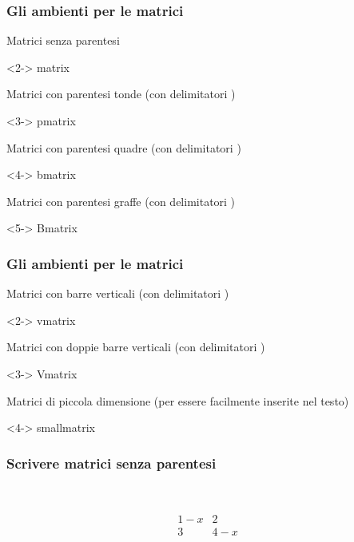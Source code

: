 \begin{frame}
  \frametitle{Gli ambienti per le matrici}
	Matrici	senza parentesi
	\begin{LaTeXcode}<2->
		matrix
	\end{LaTeXcode}
	Matrici con parentesi tonde (con delimitatori \LCmd[]{(}\;\LCmd[]{)})
	\begin{LaTeXcode}<3->
		pmatrix
	\end{LaTeXcode}
	Matrici con parentesi quadre (con delimitatori \LCmd[]{\ls\;\rs})
	\begin{LaTeXcode}<4->
		bmatrix
	\end{LaTeXcode}
	Matrici con parentesi graffe (con delimitatori \LCmd[]{\tlb}\;\LCmd[]{\trb})
	\begin{LaTeXcode}<5->
		Bmatrix
	\end{LaTeXcode}
\end{frame}
\begin{frame}
  \frametitle{Gli ambienti per le matrici}
	Matrici con barre verticali (con delimitatori \LCmd[]{|}\;\LCmd[]{|})
	\begin{LaTeXcode}<2->
		vmatrix
	\end{LaTeXcode}
	Matrici con doppie barre verticali (con delimitatori \LCmd[]{||}\;\LCmd[]{||})
	\begin{LaTeXcode}<3->
		Vmatrix
	\end{LaTeXcode}
	Matrici di piccola dimensione (per essere facilmente inserite nel testo)
	\begin{LaTeXcode}<4->
		smallmatrix
	\end{LaTeXcode}
\end{frame}
\begin{frame}
  \frametitle{Scrivere matrici senza parentesi}
	\begin{LaTeXcode}
		\\[\n
		\alert{\\begin\{matrix\}}\n
		\hspace*{5ex} 1-x \& 2 \bs\bs\n
		\hspace*{5ex} 3   \& 4-x \n
		\alert{\\end\{matrix\}}\n
		\\]
	\end{LaTeXcode}
	\begin{LaTeXoutput}
		\[
		\begin{matrix}
		1-x & 2 \\
		3 & 4-x
		\end{matrix}
		\]
	\end{LaTeXoutput}
\end{frame}
